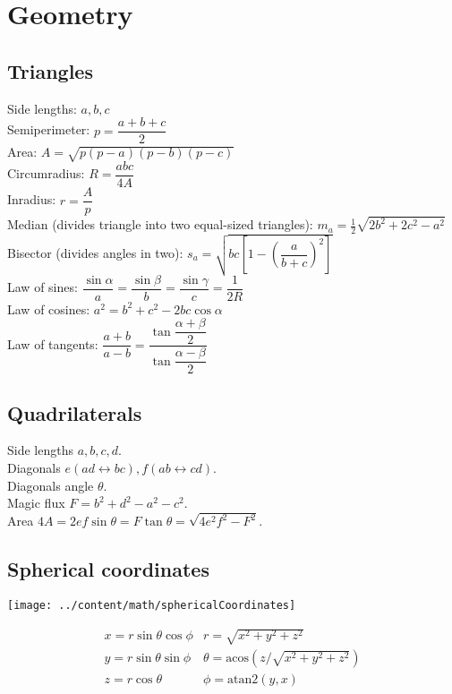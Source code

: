 \section{Geometry}

\subsection{Triangles}
Side lengths: $a,b,c$\\
Semiperimeter: $p=\dfrac{a+b+c}{2}$\\
Area: $A=\sqrt{p(p-a)(p-b)(p-c)}$\\
Circumradius: $R=\dfrac{abc}{4A}$\\
Inradius: $r=\dfrac{A}{p}$\\
Median (divides triangle into two equal-sized triangles): $m_a=\tfrac{1}{2}\sqrt{2b^2+2c^2-a^2}$\\
Bisector (divides angles in two): $s_a=\sqrt{bc\left[1-\left(\dfrac{a}{b+c}\right)^2\right]}$\\
Law of sines: $\dfrac{\sin\alpha}{a}=\dfrac{\sin\beta}{b}=\dfrac{\sin\gamma}{c}=\dfrac{1}{2R}$\\
Law of cosines: $a^2=b^2+c^2-2bc\cos\alpha$\\
Law of tangents: $\dfrac{a+b}{a-b}=\dfrac{\tan\dfrac{\alpha+\beta}{2}}{\tan\dfrac{\alpha-\beta}{2}}$\\

\subsection{Quadrilaterals}
Side lengths $a,b,c,d$.\\
Diagonals $e(ad\leftrightarrow bc), f(ab\leftrightarrow cd)$.\\
Diagonals angle $\theta$.\\
Magic flux $F=b^2+d^2-a^2-c^2$.\\
Area $4A=2ef\sin\theta=F\tan\theta=\sqrt{4e^2f^2-F^2}$.\\

\subsection{Spherical coordinates}
\centerline{\texttt{[image: ../content/math/sphericalCoordinates]}}
\[\begin{array}{cc}
x = r\sin\theta\cos\phi & r = \sqrt{x^2+y^2+z^2}\\
y = r\sin\theta\sin\phi & \theta = \textrm{acos}(z/\sqrt{x^2+y^2+z^2})\\
z = r\cos\theta & \phi = \textrm{atan2}(y,x)
\end{array}\]

